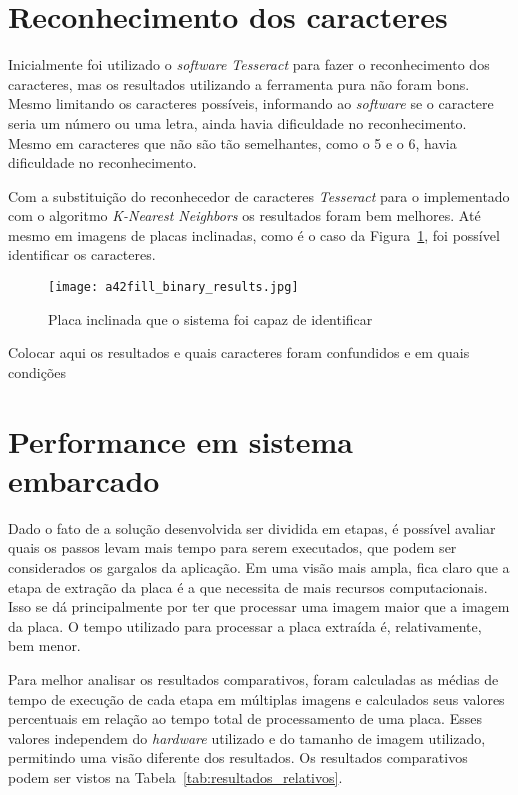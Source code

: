 \section{Reconhecimento dos caracteres}
\label{sec:reconhecimento_dos_caracteres_resultados}

Inicialmente foi utilizado o \emph{software Tesseract} para fazer o reconhecimento dos caracteres, mas os resultados utilizando a ferramenta pura não foram bons. Mesmo limitando os caracteres possíveis, informando ao \emph{software} se o caractere seria um número ou uma letra, ainda havia dificuldade no reconhecimento. Mesmo em caracteres que não são tão semelhantes, como o 5 e o 6, havia dificuldade no reconhecimento.

Com a substituição do reconhecedor de caracteres \emph{Tesseract} para o implementado com o algoritmo \emph{K-Nearest Neighbors} os resultados foram bem melhores. Até mesmo em imagens de placas inclinadas, como é o caso da Figura~\ref{fig:plate_torta_result}, foi possível identificar os caracteres.

\begin{figure}[H]
	\centering
	\texttt{[image: a42fill\_binary\_results.jpg]}
	\caption{Placa inclinada que o sistema foi capaz de identificar}
	\label{fig:plate_torta_result}
\end{figure}

Colocar aqui os resultados e quais caracteres foram confundidos e em quais condições

\section{Performance em sistema embarcado}
\label{sec:performance_resultados}

Dado o fato de a solução desenvolvida ser dividida em etapas, é possível avaliar quais os passos levam mais tempo para serem executados, que podem ser considerados os gargalos da aplicação. Em uma visão mais ampla, fica claro que a etapa de extração da placa é a que necessita de mais recursos computacionais. Isso se dá principalmente por ter que processar uma imagem maior que a imagem da placa. O tempo utilizado para processar a placa extraída é, relativamente, bem menor.

Para melhor analisar os resultados comparativos, foram calculadas as médias de tempo de execução de cada etapa em múltiplas imagens e calculados seus valores percentuais em relação ao tempo total de processamento de uma placa. Esses valores independem do \emph{hardware} utilizado e do tamanho de imagem utilizado, permitindo uma visão diferente dos resultados. Os resultados comparativos podem ser vistos na Tabela~\ref{tab:resultados_relativos}.

